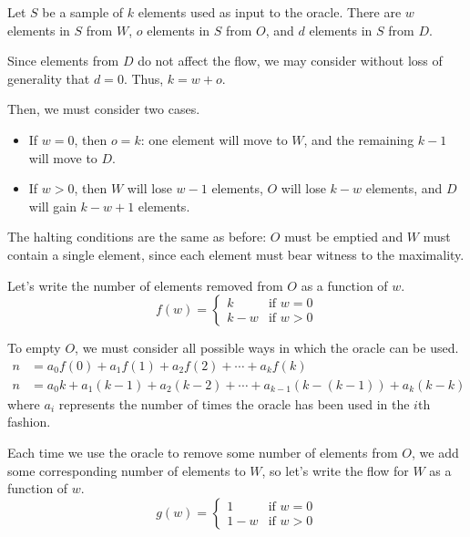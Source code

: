 \documentclass{article}
\begin{document}
\begin{description}
        Let $S$ be a sample of $k$ elements used as input to the oracle. There
        are $w$ elements in $S$ from $W$, $o$ elements in $S$ from $O$, and $d$
        elements in $S$ from $D$.

        Since elements from $D$ do not affect the flow, we may consider without
        loss of generality that $d = 0$. Thus, $k = w + o$.

        Then, we must consider two cases.
        \begin{itemize}
            \item If $w = 0$, then $o = k$: one element will move to $W$, and
                the remaining $k-1$ will move to $D$.
            \item If $w > 0$, then $W$ will lose $w - 1$ elements, $O$ will
                lose $k - w$ elements, and $D$ will gain $k - w + 1$ elements.
        \end{itemize}

        The halting conditions are the same as before: $O$ must be emptied and
        $W$ must contain a single element, since each element must bear witness
        to the maximality.

        Let's write the number of elements removed from $O$ as a function of
        $w$.
        $$
        f(w) = \begin{cases}
            k & \text{if } w = 0 \\
            k - w & \text{if } w > 0
        \end{cases}
        $$

        To empty $O$, we must consider all possible ways in which the oracle
        can be used.
        \begin{align*}
            n &= a_0 f(0) + a_1 f(1) + a_2 f(2) + \cdots + a_k f(k) \\
            n &= a_0 k + a_1 (k - 1) + a_2 (k - 2) + \cdots + a_{k-1} (k - (k-1)) + a_k (k - k)
        \end{align*}
        where $a_i$ represents the number of times the oracle has been used in
        the $i$th fashion.

        Each time we use the oracle to remove some number of elements from $O$,
        we add some corresponding number of elements to $W$, so let's write the
        flow for $W$ as a function of $w$.
        $$
        g(w) = \begin{cases}
            1 & \text{if } w = 0 \\
            1 - w & \text{if } w > 0
        \end{cases}
        $$


\end{description}
\end{document}
